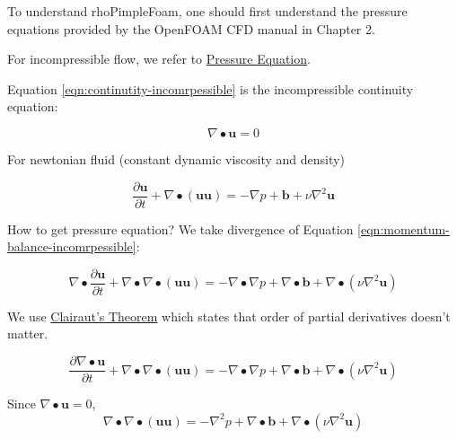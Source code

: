 \documentclass[masters]{ucbthesis}
\renewcommand{\_}{\kern-1.5pt\textunderscore\kern-1.5pt}
\begin{document}
To understand rhoPimpleFoam, one should first understand the 
pressure equations provided by the OpenFOAM CFD manual 
\citep{greenshields2022notes} in Chapter 2. 

For incompressible flow, we refer to 
\href{https://doc.cfd.direct/notes/cfd-general-principles/incompressible-flow}{Pressure Equation}.

Equation \ref{eqn:continutity-incomrpessible} is the incompressible 
continuity equation:

\begin{equation} \label{eqn:continutity-incomrpessible}
	\nabla \bullet \mathbf{u} = 0
\end{equation}

For newtonian fluid (constant dynamic viscosity and density) 

\begin{equation} \label{eqn:momentum-balance-incomrpessible}
	\frac{\partial \mathbf{u}}{\partial t} 
	+ \nabla \bullet (\mathbf{u} \mathbf{u})
	= 
	-\nabla p 
	+ \mathbf{b} 
	+\nu \nabla^2 \mathbf{u}
\end{equation}

How to get pressure equation? We take divergence of 
Equation \ref{eqn:momentum-balance-incomrpessible}:

\begin{equation*} 
	\nabla \bullet \frac{\partial \mathbf{u}}{\partial t} 
	+ \nabla \bullet\nabla \bullet (\mathbf{u} \mathbf{u})
	= 
	-\nabla \bullet\nabla p 
	+ \nabla \bullet\mathbf{b} 
	+\nabla \bullet (\nu \nabla^2 \mathbf{u})
\end{equation*}

We use \href{https://www.geeksforgeeks.org/engineering-mathematics/clairauts-theorem/}{Clairaut's Theorem} 
which states that order of partial derivatives doesn't matter.


\begin{equation*} 
	 \frac{\partial \nabla \bullet\mathbf{u}}{\partial t} 
	+ \nabla \bullet\nabla \bullet (\mathbf{u} \mathbf{u})
	= 
	-\nabla \bullet\nabla p 
	+ \nabla \bullet\mathbf{b} 
	+\nabla \bullet (\nu \nabla^2 \mathbf{u})
\end{equation*}

Since $\nabla \bullet \mathbf{u} = 0$, 
\begin{equation*} 
	\nabla \bullet\nabla \bullet (\mathbf{u} \mathbf{u})
	= 
	-\nabla^2 p 
	+ \nabla \bullet\mathbf{b} 
	+\nabla \bullet (\nu \nabla^2 \mathbf{u})
\end{equation*}
\end{document}
